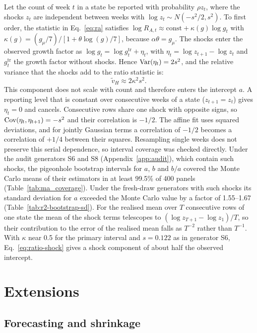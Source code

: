 Let the count of week $t$ in a state be reported with probability $\rho z_t$, where the shocks $z_t$ are independent between weeks with $\log z_t\sim N(-s^2/2,s^2)$. To first order, the statistic in Eq.~\eqref{eq:ra} satisfies $\log R_{A,t}\approx\mathrm{const}+\kappa(g)\log g_t$ with $\kappa(g)=(g_\mu/7)/[1+\theta\log(g)/7]$, because $\alpha\theta=g_\mu$. The shocks enter the observed growth factor as $\log g_t=\log g^{\mathrm{tr}}_t+\eta_t$, with $\eta_t=\log z_{t+1}-\log z_t$ and $g^{\mathrm{tr}}_t$ the growth factor without shocks. Hence $\operatorname{Var}(\eta_t)=2s^2$, and the relative variance that the shocks add to the ratio statistic is:
\begin{equation}
 \tilde v_H\approx2\kappa^2s^2 .
 \label{eq:ratio-shock}
\end{equation}
This component does not scale with count and therefore enters the intercept $a$. A reporting level that is constant over consecutive weeks of a state ($z_{t+1}=z_t$) gives $\eta_t=0$ and cancels. Consecutive rows share one shock with opposite signs, so $\operatorname{Cov}(\eta_t,\eta_{t+1})=-s^2$ and their correlation is $-1/2$. The affine fit uses squared deviations, and for jointly Gaussian terms a correlation of $-1/2$ becomes a correlation of $+1/4$ between their squares. Resampling single weeks does not preserve this serial dependence, so interval coverage was checked directly. Under the audit generators S6 and S8 (Appendix~\ref{app:audit}), which contain such shocks, the pigeonhole bootstrap intervals for $a$, $b$ and $b/a$ covered the Monte Carlo means of their estimators in at least 99.5\% of 400 panels (Table~\ref{tab:ma_coverage}). Under the fresh-draw generators with such shocks its standard deviation for $a$ exceeded the Monte Carlo value by a factor of 1.55--1.67 (Table~\ref{tab:r2-bootstrap-sd}). For the realised mean over $T$ consecutive rows of one state the mean of the shock terms telescopes to $(\log z_{T+1}-\log z_1)/T$, so their contribution to the error of the realised mean falls as $T^{-2}$ rather than $T^{-1}$. With $\kappa$ near 0.5 for the primary interval and $s=0.122$ as in generator S6, Eq.~\eqref{eq:ratio-shock} gives a shock component of about half the observed intercept.

\section{Extensions}
\label{app:extensions}

\subsection{Forecasting and shrinkage}
\label{app:forecast}

